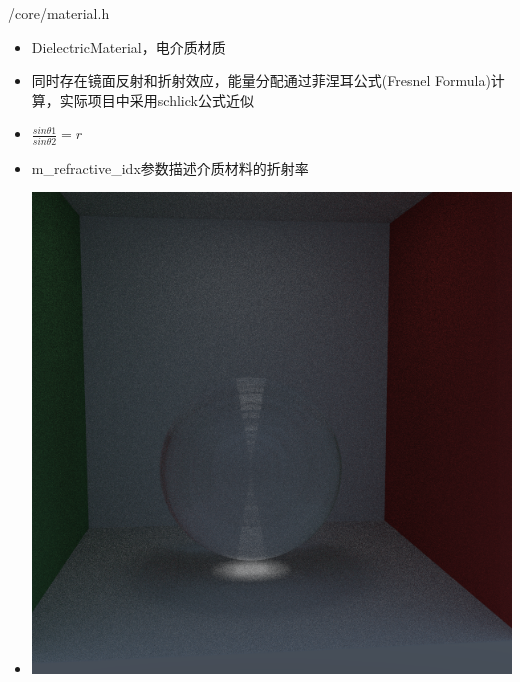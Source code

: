 \documentclass{beamer}
\begin{document}
\begin{frame} {/core/material.h}
\begin{itemize}
\item DielectricMaterial，电介质材质
\item 同时存在镜面反射和折射效应，能量分配通过菲涅耳公式(Fresnel Formula)计算，实际项目中采用schlick公式近似
\item $\frac{sin \theta 1}{sin \theta 2} = r$
\item m\_refractive\_idx参数描述介质材料的折射率
\item \includegraphics[scale=0.15]{glass}
\end{itemize}
\end{frame}
\end{document}

